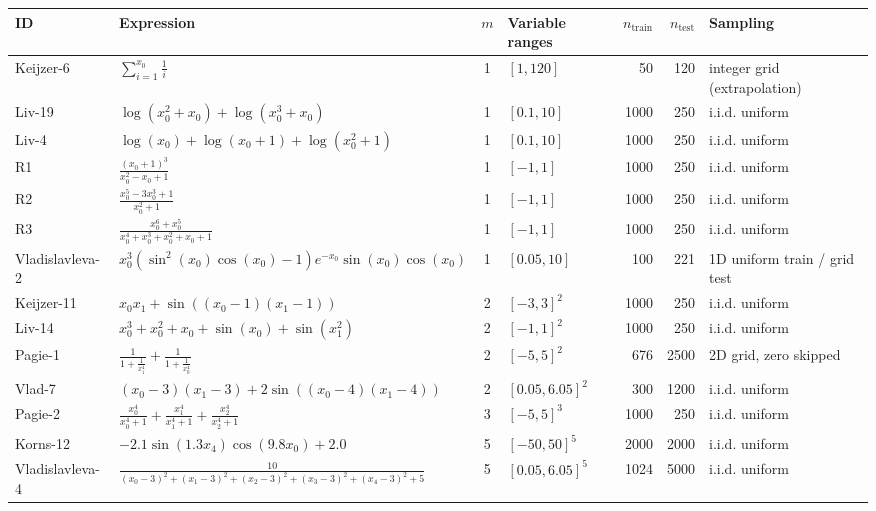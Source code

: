\setlength{\tabcolsep}{4pt}
\begin{tabular}{@{}llclrrl@{}}
\toprule
ID & Expression & $m$ & Variable ranges & $n_{\mathrm{train}}$ & $n_{\mathrm{test}}$ & Sampling \\
\midrule
Keijzer-6 & $\sum_{i=1}^{x_{0}} \frac{1}{i}$ & 1 & $[1, 120]$ & 50 & 120 & integer grid (extrapolation) \\
Liv-19 & $\log{\left(x_{0}^{2} + x_{0} \right)} + \log{\left(x_{0}^{3} + x_{0} \right)}$ & 1 & $[0.1, 10]$ & 1000 & 250 & i.i.d. uniform \\
Liv-4 & $\log{\left(x_{0} \right)} + \log{\left(x_{0} + 1 \right)} + \log{\left(x_{0}^{2} + 1 \right)}$ & 1 & $[0.1, 10]$ & 1000 & 250 & i.i.d. uniform \\
R1 & $\frac{\left(x_{0} + 1\right)^{3}}{x_{0}^{2} - x_{0} + 1}$ & 1 & $[-1, 1]$ & 1000 & 250 & i.i.d. uniform \\
R2 & $\frac{x_{0}^{5} - 3 x_{0}^{3} + 1}{x_{0}^{2} + 1}$ & 1 & $[-1, 1]$ & 1000 & 250 & i.i.d. uniform \\
R3 & $\frac{x_{0}^{6} + x_{0}^{5}}{x_{0}^{4} + x_{0}^{3} + x_{0}^{2} + x_{0} + 1}$ & 1 & $[-1, 1]$ & 1000 & 250 & i.i.d. uniform \\
Vladislavleva-2 & $x_{0}^{3} \left(\sin^{2}{\left(x_{0} \right)} \cos{\left(x_{0} \right)} - 1\right) e^{- x_{0}} \sin{\left(x_{0} \right)} \cos{\left(x_{0} \right)}$ & 1 & $[0.05, 10]$ & 100 & 221 & 1D uniform train / grid test \\
Keijzer-11 & $x_{0} x_{1} + \sin{\left(\left(x_{0} - 1\right) \left(x_{1} - 1\right) \right)}$ & 2 & $[-3, 3]^{2}$ & 1000 & 250 & i.i.d. uniform \\
Liv-14 & $x_{0}^{3} + x_{0}^{2} + x_{0} + \sin{\left(x_{0} \right)} + \sin{\left(x_{1}^{2} \right)}$ & 2 & $[-1, 1]^{2}$ & 1000 & 250 & i.i.d. uniform \\
Pagie-1 & $\frac{1}{1 + \frac{1}{x_{1}^{4}}} + \frac{1}{1 + \frac{1}{x_{0}^{4}}}$ & 2 & $[-5, 5]^{2}$ & 676 & 2500 & 2D grid, zero skipped \\
Vlad-7 & $\left(x_{0} - 3\right) \left(x_{1} - 3\right) + 2 \sin{\left(\left(x_{0} - 4\right) \left(x_{1} - 4\right) \right)}$ & 2 & $[0.05, 6.05]^{2}$ & 300 & 1200 & i.i.d. uniform \\
Pagie-2 & $\frac{x_{0}^{4}}{x_{0}^{4} + 1} + \frac{x_{1}^{4}}{x_{1}^{4} + 1} + \frac{x_{2}^{4}}{x_{2}^{4} + 1}$ & 3 & $[-5, 5]^{3}$ & 1000 & 250 & i.i.d. uniform \\
Korns-12 & $- 2.1 \sin{\left(1.3 x_{4} \right)} \cos{\left(9.8 x_{0} \right)} + 2.0$ & 5 & $[-50, 50]^{5}$ & 2000 & 2000 & i.i.d. uniform \\
Vladislavleva-4 & $\frac{10}{\left(x_{0} - 3\right)^{2} + \left(x_{1} - 3\right)^{2} + \left(x_{2} - 3\right)^{2} + \left(x_{3} - 3\right)^{2} + \left(x_{4} - 3\right)^{2} + 5}$ & 5 & $[0.05, 6.05]^{5}$ & 1024 & 5000 & i.i.d. uniform \\
\bottomrule
\end{tabular}
